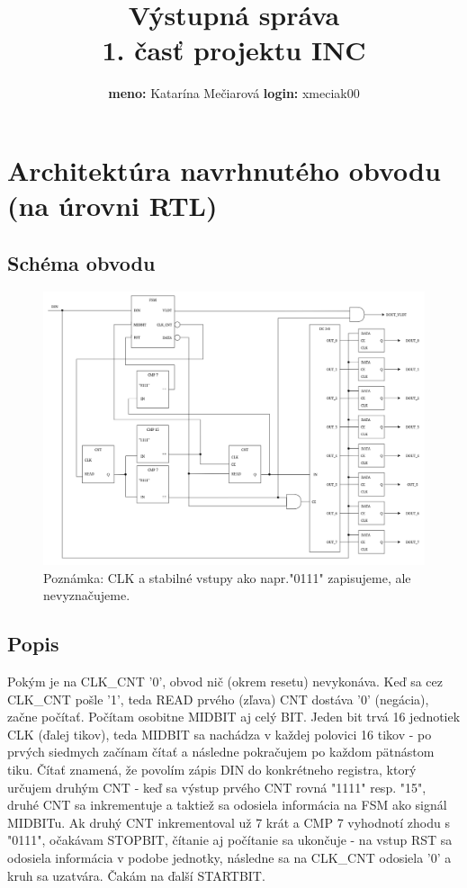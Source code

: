 \documentclass[11pt]{article}
\title{\textbf{Výstupná správa\\1. časť projektu INC}}
\author{\textbf{meno:} Katarína Mečiarová \hspace{2.3cm} \textbf{login:} xmeciak00}\date{}
\begin{document}
\maketitle

\section{Architektúra navrhnutého obvodu (na úrovni RTL)} 
\subsection{Schéma obvodu}
\begin{figure}[here]
    \centering
    \includegraphics[width=1\textwidth]{OBVOD.png} %
    Poznámka: CLK a stabilné vstupy ako napr."0111" zapisujeme, ale nevyznačujeme.
\end{figure}

\subsection{Popis}
Pokým je na CLK\_CNT  '0', obvod nič (okrem resetu) nevykonáva. Keď sa cez CLK\_CNT pošle '1', teda READ prvého (zľava) CNT dostáva '0' (negácia), začne počítať.
Počítam osobitne MIDBIT aj celý BIT. 
Jeden bit trvá 16 jednotiek CLK (ďalej tikov), teda MIDBIT sa nachádza v každej polovici 16 tikov - po prvých siedmych začínam čítať a následne pokračujem po každom pätnástom tiku. 
Čítať znamená, že povolím zápis DIN do konkrétneho registra, ktorý určujem druhým CNT - keď sa výstup prvého CNT rovná "1111" resp. "15", druhé CNT sa inkrementuje a taktiež sa odosiela informácia na FSM ako signál MIDBITu. 
Ak druhý CNT inkrementoval už 7 krát a CMP 7 vyhodnotí zhodu s "0111", očakávam STOPBIT, čítanie aj počítanie sa ukončuje - na vstup RST sa odosiela informácia v podobe jednotky, následne sa na CLK\_CNT odosiela '0' a kruh sa uzatvára. Čakám na ďalší STARTBIT.
\end{document}
